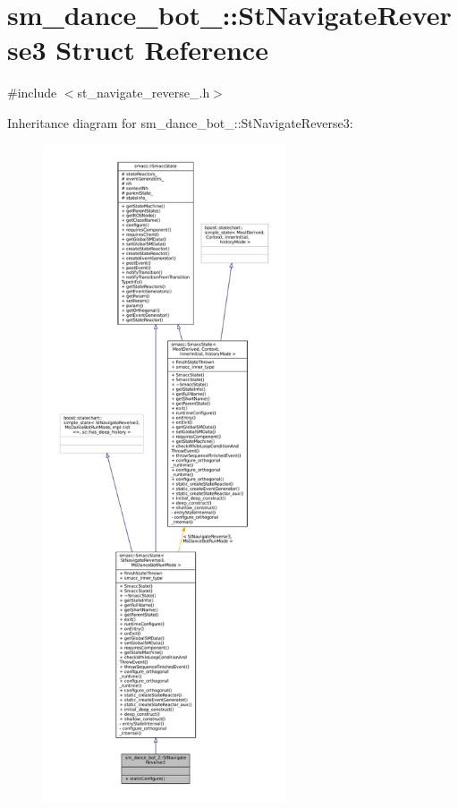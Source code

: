 \hypertarget{structsm__dance__bot__2_1_1StNavigateReverse3}{}\section{sm\+\_\+dance\+\_\+bot\+\_\+:\+:St\+Navigate\+Reverse3 Struct Reference}
\label{structsm__dance__bot__2_1_1StNavigateReverse3}


{\ttfamily \#include $<$st\+\_\+navigate\+\_\+reverse\+\_.\+h$>$}



Inheritance diagram for sm\+\_\+dance\+\_\+bot\+\_\+:\+:St\+Navigate\+Reverse3\+:
\nopagebreak
\begin{figure}[H]
\begin{center}
\leavevmode
\includegraphics[height=550pt]{structsm__dance__bot__2_1_1StNavigateReverse3__inherit__graph}
\end{center}
\end{figure}


